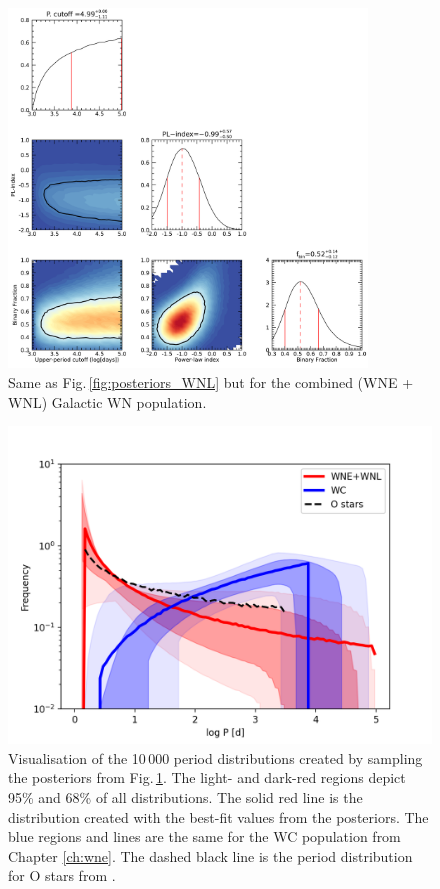 \begin{figure}[ht]
    \centering
    \includegraphics[width=0.85\textwidth]{chapters/WNL/image/WNall_May18_4RVbins_stat9.png}
    \caption{Same as Fig.\,\ref{fig:posteriors_WNL} but for the combined (WNE + WNL) Galactic WN population.}
    \label{fig:posteriors_WN}
\end{figure}

\begin{figure}
    \centering
    \includegraphics[width=\hsize]{chapters/WNL/image/WNall_sampled_periods_log.png}
    \caption{Visualisation of the 10\,000 period distributions created by sampling the posteriors from Fig.\,\ref{fig:posteriors_WN}. The light- and dark-red regions depict 95\% and 68\% of all distributions. The solid red line is the distribution created with the best-fit values from the posteriors. The blue regions and lines are the same for the WC population from Chapter \ref{ch:wne}. The dashed black line is the period distribution for O stars from \citet{sana_binary_2012}.}
    \label{fig:pdist_WN_WC}
\end{figure}
